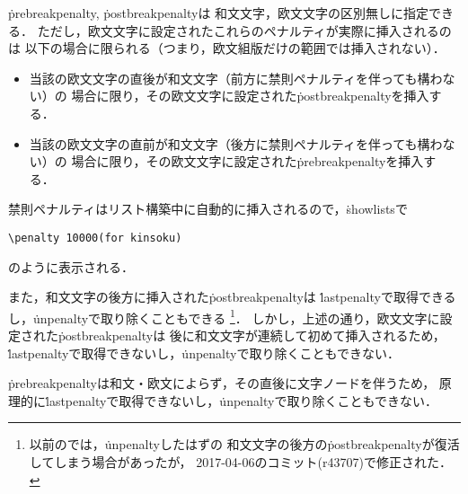 \documentclass[a4paper,11pt,nomag,dvipdfmx]{jsarticle}
\begin{document}
\.{prebreakpenalty}, \.{postbreakpenalty}は
和文文字，欧文文字の区別無しに指定できる．
ただし，欧文文字に設定されたこれらのペナルティが実際に挿入されるのは
以下の場合に限られる（つまり，欧文組版だけの範囲では挿入されない）．
\begin{itemize}
  \item 当該の欧文文字の直後が和文文字（前方に禁則ペナルティを伴っても構わない）の
    場合に限り，その欧文文字に設定された\.{postbreakpenalty}を挿入する．
  \item 当該の欧文文字の直前が和文文字（後方に禁則ペナルティを伴っても構わない）の
    場合に限り，その欧文文字に設定された\.{prebreakpenalty}を挿入する．
\end{itemize}
\iffalse %
\begin{dangerous}
上記の「欧文文字に設定された禁則ペナルティが挿入される状況」は
欧文文字と和文文字の境界であり，
ベースライン補正（\ref{sec:baselineshift}節を参照）を実現する
\node{disp_node}の挿入箇所でもある．
ベースライン補正がゼロでないとき，\node{penalty_node}と\node{disp_node}の
挿入順序は以下のようにしている． %
\begin{itemize}
  \item 欧文→和文文字間： \node{disp_node} → \node{penalty_node} (\.{postbreakpenalty}) の順
  \item 和文→欧文文字間： \node{penalty_node} (\.{prebreakpenalty}) → \node{disp_node} の順
\end{itemize}
\end{dangerous}
\fi %

\begin{dangerous}
禁則ペナルティはリスト構築中に自動的に挿入されるので，\.{showlists}で
\begin{verbatim}
\penalty 10000(for kinsoku)
\end{verbatim}
のように表示される．

また，和文文字の後方に挿入された\.{postbreakpenalty}は
\.{lastpenalty}で取得できるし，\.{unpenalty}で取り除くこともできる
\footnote{以前の\pTeX では，\.{unpenalty}したはずの
和文文字の後方の\.{postbreakpenalty}が復活してしまう場合があったが，
2017-04-06のコミット(r43707)で修正された\cite{tjb11}．}．
しかし，上述の通り，欧文文字に設定された\.{postbreakpenalty}は
後に和文文字が連続して初めて挿入されるため，
\.{lastpenalty}で取得できないし，\.{unpenalty}で取り除くこともできない．

\.{prebreakpenalty}は和文・欧文によらず，その直後に文字ノードを伴うため，
原理的に\.{lastpenalty}で取得できないし，\.{unpenalty}で取り除くこともできない．
\end{dangerous}
\end{document}
